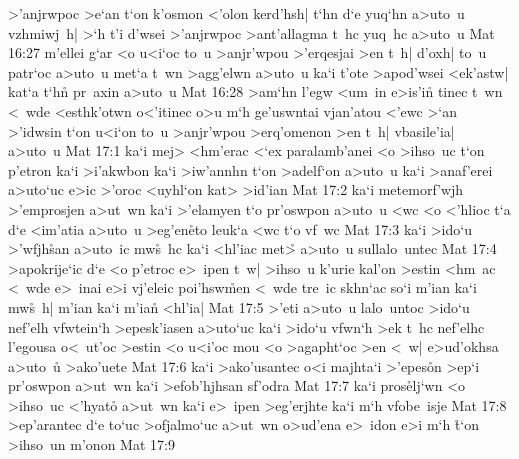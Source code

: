 >'anjrwpoc
>e`an
t`on
k'osmon
<'olon
kerd'hsh|
t`hn
d`e
yuq`hn
a>uto~u
vzhmiwj~h|
>`h
t'i
d'wsei
>'anjrwpoc
>ant'allagma
t~hc
yuq~hc
a>uto~u\bibvsend
\vs Mat 16:27
m'ellei
g`ar
<o
u<i`oc
to~u
>anjr'wpou
>'erqesjai
>en
t~h|
d'oxh|
to~u
patr`oc
a>uto~u
met`a
t~wn
>agg'elwn
a>uto~u
ka`i
t'ote
>apod'wsei
<ek'astw|
kat`a
t`hn\r{}
pr~axin
a>uto~u\bibvsend
\vs Mat 16:28
>am`hn
l'egw
<um~in
e>is'in\r{}
tinec
t~wn
<~wde
<esthk'otwn
o<'itinec
o>u
m`h
ge'uswntai
vjan'atou
<'ewc
>`an
>'idwsin
t`on
u<i`on
to~u
>anjr'wpou
>erq'omenon
>en
t~h|
vbasile'ia|
a>uto~u\bibvsend
\vs Mat 17:1
ka`i
mej>
<hm'erac
<`ex
paralamb'anei
<o
>ihso~uc
t`on
p'etron
ka`i
>i'akwbon
ka`i
>iw'annhn
t`on
>adelf`on
a>uto~u
ka`i
>anaf'erei
a>uto`uc
e>ic
>'oroc
<uyhl`on
kat>
>id'ian\bibvsend
\vs Mat 17:2
ka`i
metemorf'wjh
>'emprosjen
a>ut~wn
ka`i
>'elamyen
t`o
pr'oswpon
a>uto~u
<wc
<o
<'hlioc
t`a
d`e
<im'atia
a>uto~u
>eg'en\r{e}to
leuk`a
<wc
t`o
vf~wc\bibvsend
\vs Mat 17:3
ka`i
>ido`u
>'wfjh\r{s}an
a>uto~ic
mw\r{s}~hc
ka`i
<hl'iac
met>\r{}
a>uto~u
sullalo~untec\bibvsend
\vs Mat 17:4
>apokrije`ic
d`e
<o
p'etroc
e>~ipen
t~w|
>ihso~u
k'urie
kal'on
>estin
<hm~ac
<~wde
e>~inai
e>i
vj'eleic
poi'hsw\r{m}en
<~wde
tre~ic
skhn`ac
so`i
m'ian
ka`i
mw\r{s}~h|
m'ian
ka`i
m'ian\r{}
<hl'ia|\bibvsend
\vs Mat 17:5
>'eti
a>uto~u
lalo~untoc
>ido`u
nef'elh
vfwtein`h
>epesk'iasen
a>uto`uc
ka`i
>ido`u
vfwn`h
>ek
t~hc
nef'elhc
l'egousa
o<~ut'oc
>estin
<o
u<i'oc
mou
<o
>agapht`oc
>en
<~w|
e>ud'okhsa
a>uto~u\r{}
>ako'uete\bibvsend
\vs Mat 17:6
ka`i
>ako'usantec
o<i
majhta`i
>'epes\r{o}n
>ep`i
pr'oswpon
a>ut~wn
ka`i
>efob'hjhsan
sf'odra\bibvsend
\vs Mat 17:7
ka`i
pros\r{e}lj`wn
<o
>ihso~uc
<'hyato\r{}
a>ut~wn
ka`i
e>~ipen
>eg'erjhte
ka`i
m`h
vfobe~isje\bibvsend
\vs Mat 17:8
>ep'arantec
d`e
to`uc
>ofjalmo`uc
a>ut~wn
o>ud'ena
e>~idon
e>i
m`h
\r{t}`on
>ihso~un
m'onon\bibvsend
\vs Mat 17:9
